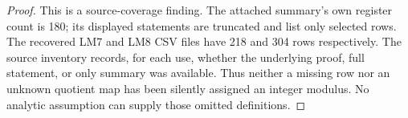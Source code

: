 \begin{proof}
This is a source-coverage finding. The attached summary's own register
count is 180; its displayed statements are truncated and list only
selected rows. The recovered LM7 and LM8 CSV files have 218 and 304
rows respectively. The source inventory records, for each use, whether
the underlying proof, full statement, or only summary was available.
Thus neither a missing row nor an unknown quotient map has been
silently assigned an integer modulus. No analytic assumption can
supply those omitted definitions.
\end{proof}

